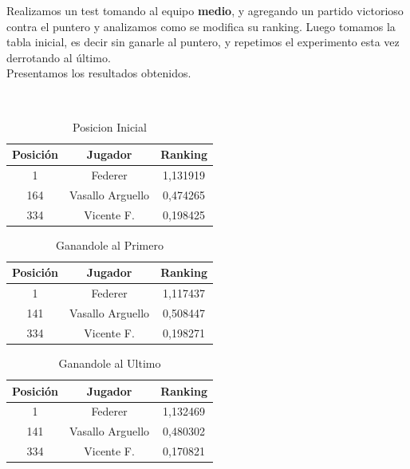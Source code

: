 Realizamos un test tomando al equipo \textbf{medio}, y agregando un partido victorioso contra el puntero y analizamos como se modifica su ranking. Luego tomamos la tabla inicial, es decir sin ganarle al puntero, y repetimos el experimento esta vez derrotando al último. \\

Presentamos los resultados obtenidos.

\\

\begin{table}[H]
    \caption{Posicion Inicial}
    \centering
    \begin{tabular}{c c c}
        \hline \hline
        Posición & Jugador & Ranking \\
        \hline
        1 & Federer & 1,131919 \\
        164 & Vasallo Arguello & 0,474265 \\
        334 & Vicente F. & 0,198425 \\
    \end{tabular}
\end{table}

\begin{table}[H]
    \caption{Ganandole al Primero}
    \centering
    \begin{tabular}{c c c}
        \hline \hline
        Posición & Jugador & Ranking \\
        \hline
        1 & Federer & 1,117437 \\
        141 & Vasallo Arguello & 0,508447 \\
        334 & Vicente F. & 0,198271 \\
        \hline
    \end{tabular}
\end{table}

\begin{table}[H]
    \caption{Ganandole al Ultimo}
    \centering
    \begin{tabular}{c c c}
        \hline \hline
        Posición & Jugador & Ranking \\
        \hline
        1 & Federer & 1,132469 \\
        141 & Vasallo Arguello & 0,480302 \\
        334 & Vicente F. & 0,170821 \\
        \hline
    \end{tabular}
\end{table}

\newline

